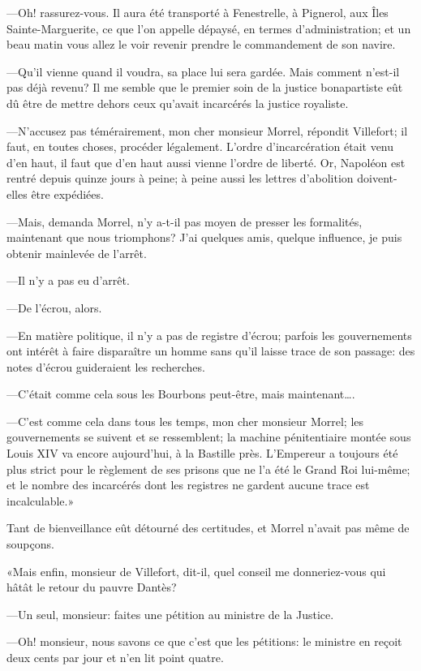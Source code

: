—Oh! rassurez-vous. Il aura été transporté à Fenestrelle, à Pignerol, aux Îles Sainte-Marguerite, ce que l'on appelle dépaysé, en termes d'administration; et un beau matin vous allez le voir revenir prendre le commandement de son navire.

—Qu'il vienne quand il voudra, sa place lui sera gardée. Mais comment n'est-il pas déjà revenu? Il me semble que le premier soin de la justice bonapartiste eût dû être de mettre dehors ceux qu'avait incarcérés la justice royaliste.

—N'accusez pas témérairement, mon cher monsieur Morrel, répondit Villefort; il faut, en toutes choses, procéder légalement. L'ordre d'incarcération était venu d'en haut, il faut que d'en haut aussi vienne l'ordre de liberté. Or, Napoléon est rentré depuis quinze jours à peine; à peine aussi les lettres d'abolition doivent-elles être expédiées.

—Mais, demanda Morrel, n'y a-t-il pas moyen de presser les formalités, maintenant que nous triomphons? J'ai quelques amis, quelque influence, je puis obtenir mainlevée de l'arrêt.

—Il n'y a pas eu d'arrêt.

—De l'écrou, alors.

—En matière politique, il n'y a pas de registre d'écrou; parfois les gouvernements ont intérêt à faire disparaître un homme sans qu'il laisse trace de son passage: des notes d'écrou guideraient les recherches.

—C'était comme cela sous les Bourbons peut-être, mais maintenant\dots.

—C'est comme cela dans tous les temps, mon cher monsieur Morrel; les gouvernements se suivent et se ressemblent; la machine pénitentiaire montée sous Louis XIV va encore aujourd'hui, à la Bastille près. L'Empereur a toujours été plus strict pour le règlement de ses prisons que ne l'a été le Grand Roi lui-même; et le nombre des incarcérés dont les registres ne gardent aucune trace est incalculable.»

Tant de bienveillance eût détourné des certitudes, et Morrel n'avait pas même de soupçons.

«Mais enfin, monsieur de Villefort, dit-il, quel conseil me donneriez-vous qui hâtât le retour du pauvre Dantès?

—Un seul, monsieur: faites une pétition au ministre de la Justice.

—Oh! monsieur, nous savons ce que c'est que les pétitions: le ministre en reçoit deux cents par jour et n'en lit point quatre.

